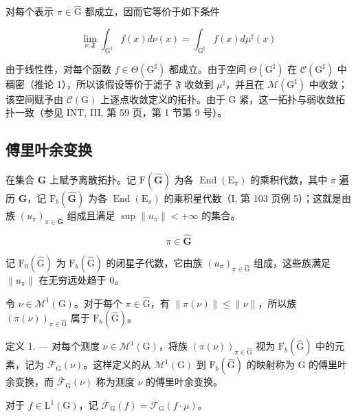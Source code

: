 对每个表示 \(\pi\in\widehat{\mathrm{G}}\) 都成立，因而它等价于如下条件

\[
\lim _ {\nu , \mathfrak {F}} \int_ {\mathrm{G} ^ {\sharp}} f (x) d \nu (x) = \int_ {\mathrm{G} ^ {\sharp}} f (x) d \mu^ {\sharp} (x)
\]

由于线性性，对每个函数 \(f \in \Theta(\mathrm{G}^{\sharp})\) 都成立。由于空间 \(\Theta(\mathrm{G}^{\sharp})\) 在 \(\mathcal{C}(\mathrm{G}^{\sharp})\) 中稠密（推论 1），所以该假设等价于滤子 \(\mathfrak{F}\) 收敛到 \(\mu^{\sharp}\)，并且在 \(\mathcal{M}(\mathrm{G}^{\sharp})\) 中收敛；该空间赋予由 \(\mathcal{C}(\mathrm{G})\) 上逐点收敛定义的拓扑。由于 G 紧，这一拓扑与弱收敛拓扑一致（参见 INT, III, 第 59 页，第 1 节第 9 号）。

\subsection{傅里叶余变换}

在集合 \(\widehat{\mathbf{G}}\) 上赋予离散拓扑。记 \(\mathrm{F}(\widehat{\mathbf{G}})\) 为各 \(\operatorname{End}(\mathrm{E}_{\pi})\) 的乘积代数，其中 \(\pi\) 遍历 \(\widehat{\mathbf{G}}\)，记 \(\mathrm{F}_b(\widehat{\mathbf{G}})\) 为各 \(\operatorname{End}(\mathrm{E}_{\pi})\) 的乘积星代数（I, 第 103 页例 5）；这就是由族 \((u_{\pi})_{\pi \in \widehat{\mathbf{G}}}\) 组成且满足 \(\sup \| u_{\pi} \| < +\infty\) 的集合。

\[
\pi \in \widehat {\mathbf {G}}
\]

记 \(\mathrm{F}_{0}(\widehat{\mathrm{G}})\) 为 \(\mathrm{F}_{b}(\widehat{\mathrm{G}})\) 的闭星子代数，它由族 \((u_{\pi})_{\pi\in\widehat{\mathrm{G}}}\) 组成，这些族满足 \(\|u_{\pi}\|\) 在无穷远处趋于 0。

令 \(\nu \in \mathcal{M}^1 (\mathrm{G})\)。对于每个 \(\pi \in \widehat{\mathrm{G}}\)，有 \(\| \pi (\nu)\| \leqslant \| \nu \|\)，所以族 \((\pi (\nu))_{\pi \in \widehat{\mathrm{G}}}\) 属于 \(\mathrm{F}_b(\widehat{\mathrm{G}})\)。

定义 1. --- 对每个测度 \(\nu \in \mathcal{M}^{1}(\mathrm{G})\)，将族 \((\pi (\nu))_{\pi \in \widehat{\mathrm{G}}}\) 视为 \(\mathrm{F}_b(\widehat{\mathrm{G}})\) 中的元素，记为 \(\overline{\mathcal{F}}_{\mathrm{G}}(\nu)\)。这样定义的从 \(\mathcal{M}^1 (\mathrm{G})\) 到 \(\mathrm{F}_b(\widehat{\mathrm{G}})\) 的映射称为 G 的傅里叶余变换，而 \(\overline{\mathcal{F}}_{\mathrm{G}}(\nu)\) 称为测度 \(\nu\) 的傅里叶余变换。

对于 \(f \in \mathrm{L}^1(\mathrm{G})\)，记 \(\overline{\mathcal{F}}_{\mathrm{G}}(f) = \overline{\mathcal{F}}_{\mathrm{G}}(f \cdot \mu)\)。

